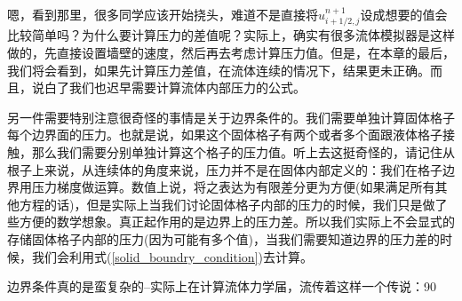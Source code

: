 \documentclass{article}
\begin{document}
嗯，看到那里，很多同学应该开始挠头，难道不是直接将$u^{n+1}_{i+1/2,j}$设成想要的值会比较简单吗？为什么要计算压力的差值呢？实际上，确实有很多流体模拟器是这样做的，先直接设置墙壁的速度，然后再去考虑计算压力值。但是，在本章的最后，我们将会看到，如果先计算压力差值，在流体连续的情况下，结果更未正确。而且，说白了我们也迟早需要计算流体内部压力的公式。
\par
另一件需要特别注意很奇怪的事情是关于边界条件的。我们需要单独计算固体格子每个边界面的压力。也就是说，如果这个固体格子有两个或者多个面跟液体格子接触，那么我们需要分别单独计算这个格子的压力值。听上去这挺奇怪的，请记住从根子上来说，从连续体的角度来说，压力并不是在固体内部定义的：我们在格子边界用压力梯度做运算。数值上说，将之表达为有限差分更为方便(如果满足所有其他方程的话)，但是实际上当我们讨论固体格子内部的压力的时候，我们只是做了些方便的数学想象。真正起作用的是边界上的压力差。所以我们实际上不会显式的存储固体格子内部的压力(因为可能有多个值)，当我们需要知道边界的压力差的时候，我们会利用式(\ref{solid_boundry_condition})去计算。
\par
边界条件真的是蛮复杂的--实际上在计算流体力学届，流传着这样一个传说：90%
\end{document}
